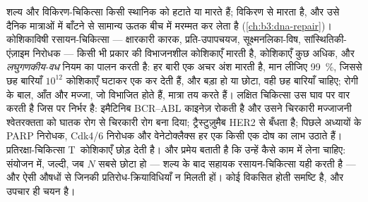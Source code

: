 \begin{example}[चिकित्साएँ और उनका तर्क]\label{ex:b3:cancer-biology:therapy}
शल्य और विकिरण-चिकित्सा किसी स्थानिक  को हटाते या मारते हैं;
विकिरण  से मारता है, और उसे दैनिक मात्राओं में बाँटने
से सामान्य ऊतक बीच में मरम्मत कर लेता है (\cref{ch:b3:dna-repair})।
कोशिकाविषी रसायन-चिकित्सा --- क्षारकारी कारक, प्रति-उपापचयज,
सूक्ष्मनलिका-विष, सांस्थितिकी-एंज़ाइम निरोधक --- किसी भी प्रकार की
विभाजनशील कोशिकाएँ मारती है,  कोशिकाएँ कुछ अधिक, और
\emph{लघुगणकीय-वध} नियम का पालन करती है: हर बारी एक अचर अंश मारती है,
मान लीजिए \qty{99}{\%}, जिससे छह बारियाँ $10^{12}$ कोशिकाएँ घटाकर एक कर
देती हैं, और  बड़ा हो या छोटा, वही छह बारियाँ चाहिए;
रोगी के बाल, आँत और मज्जा, जो विभाजित होते हैं, मात्रा तय करते हैं।
लक्षित चिकित्सा उस घाव पर वार करती है जिस पर  निर्भर है: इमैटिनिब
BCR--ABL काइनेज़ रोकती है और उसने चिरकारी मज्जाजनी श्वेतरक्तता को घातक
रोग से चिरकारी रोग बना दिया; ट्रैस्टुज़ुमैब HER2 से बँधता है; पिछले
अध्यायों के PARP निरोधक, Cdk4/6 निरोधक और वेनेटोक्लैक्स हर एक किसी एक
दोष का लाभ उठाते हैं। प्रतिरक्षा-चिकित्सा T~कोशिकाएँ छोड़ देती है। और
प्रमेय बताती है कि उन्हें कैसे काम में लेना चाहिए: संयोजन में, जल्दी,
जब $N$ सबसे छोटा हो --- शल्य के बाद सहायक रसायन-चिकित्सा यही करती है
--- और ऐसी औषधों से जिनकी प्रतिरोध-क्रियाविधियाँ न मिलती हों।
 कोई विकसित होती समष्टि है, और उपचार ही चयन है।
\end{example}

